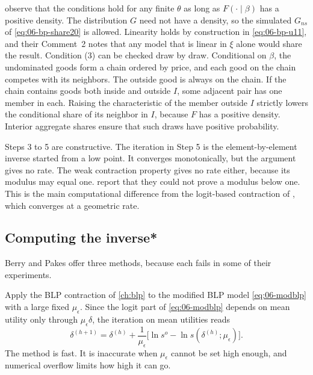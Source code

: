 \begin{remark}\label{rem:06-bp-conditions}
\citet[Comment~1]{BerryPakes2007} observe that the conditions hold for any finite $\theta$ as long as $F(\cdot \mid \beta)$
has a positive density. The distribution $G$ need not have a density, so the simulated $G_{ns}$ of
\eqref{eq:06-bp-share20} is allowed. Linearity holds by construction in \eqref{eq:06-bp-u11}, and their Comment~2 notes
that any model that is linear in $\xi$ alone would share the result. Condition (3) can be checked draw by draw.
Conditional on $\beta$, the undominated goods form a chain ordered by price, and each good on the chain competes with its
neighbors. The outside good is always on the chain. If the chain contains goods both inside and outside $I$, some
adjacent pair has one member in each. Raising the characteristic of the member outside $I$ strictly lowers the
conditional share of its neighbor in $I$, because $F$ has a positive density. Interior aggregate shares ensure that
such draws have positive probability.
\end{remark}

Steps 3 to 5 are constructive. The iteration in Step 5 is the element-by-element inverse started from a low point. It
converges monotonically, but the argument gives no rate. The weak contraction property gives no rate either, because its
modulus may equal one. \citet{BerryPakes2007} report that they could not prove a modulus below one. This is the main
computational difference from the logit-based contraction of \citet{BerryLevinsohnPakes1995}, which converges at a
geometric rate.

\subsection{Computing the inverse*}\label{sec:06-bp-compute}

Berry and Pakes offer three methods, because each fails in some of their experiments.

Apply the BLP contraction of \cref{ch:blp} to the modified BLP model \eqref{eq:06-modblp} with a large fixed
$\mu_\epsilon$. Since the logit part of \eqref{eq:06-modblp} depends on mean utility only through $\mu_\epsilon\delta$, the
iteration on mean utilities reads
\begin{equation}\label{eq:06-modblp-contraction}
  \delta^{(h+1)} = \delta^{(h)} + \frac{1}{\mu_\epsilon}\bigl[\ln s^o - \ln s(\delta^{(h)}; \mu_\epsilon)\bigr] .
\end{equation}
The method is fast. It is inaccurate when $\mu_\epsilon$ cannot be set high enough, and numerical overflow limits how
high it can go.

